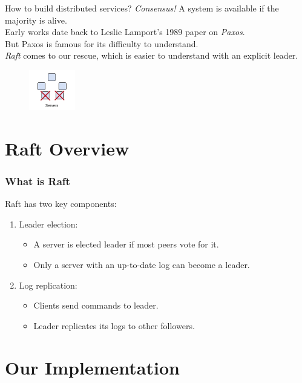 \documentclass{beamer}
\begin{document}
\begin{frame}{How to build distributed services?}
\emph{\Large Consensus!} A system is available if the majority is alive.\\[1cm]

Early works date back to Leslie Lamport's 1989 paper on \emph{Paxos}.\\
But Paxos is famous for its difficulty to understand.\\[1cm]

\emph{Raft} comes to our rescue, which is easier to understand with an explicit leader.

\begin{figure}[H]
\includegraphics[width=2cm]{major.png}
\end{figure}

\end{frame}

\section{Raft Overview}


\begin{frame}
\frametitle{What is Raft}
Raft has two key components:
\begin{enumerate}
\item Leader election:
\begin{itemize}
\item A server is elected leader if most peers vote for it.
\item Only a server with an up-to-date log can become a leader.
\end{itemize}
\item Log replication:
\begin{itemize}
\item Clients send commands to leader.
\item Leader replicates its logs to other followers.
\end{itemize}
\end{enumerate}
\end{frame}


\section{Our Implementation}
\end{document}
